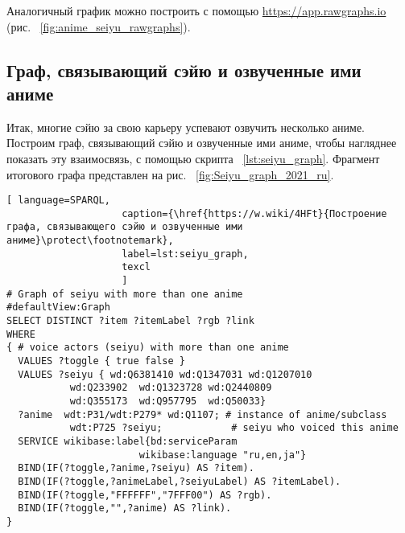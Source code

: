 \newpage

Аналогичный график можно построить с помощью \href{https://app.rawgraphs.io}{https://app.rawgraphs.io} (рис. ~\ref{fig:anime_seiyu_rawgraphs}).

\begin{figure*}[h]

    \setlength{\fboxsep}{0pt}%
    \setlength{\fboxrule}{1pt}%
	\caption[График числа ролей, озвученных различными сэйю, построенный с помощью сервиса Rawgraphs, 2021.]{График числа ролей, озвученных различными сэйю, построенный с помощью сервиса Rawgraphs, 2021. График построена на основе данных, полученных с помощью запроса~\protect\ref{lst:seiyu_titles_graph}.}%
    \label{fig:anime_seiyu_rawgraphs}%
\end{figure*} 

\subsection{Граф, связывающий сэйю и озвученные ими аниме}

Итак, многие сэйю за свою карьеру успевают озвучить несколько аниме. Построим граф, связывающий сэйю и озвученные ими аниме, чтобы нагляднее показать эту взаимосвязь, с помощью скрипта ~\protect\ref{lst:seiyu_graph}. Фрагмент итогового графа представлен на рис. ~\ref{fig:Seiyu_graph_2021_ru}. 

\lstset{numbers=left, firstnumber=1, frame=single}
\begin{lstlisting}[ language=SPARQL, 
                    caption={\href{https://w.wiki/4HFt}{Построение графа, связывающего сэйю и озвученные ими аниме}\protect\footnotemark},
                    label=lst:seiyu_graph,
                    texcl 
                    ]
# Graph of seiyu with more than one anime
#defaultView:Graph
SELECT DISTINCT ?item ?itemLabel ?rgb ?link
WHERE
{ # voice actors (seiyu) with more than one anime
  VALUES ?toggle { true false }
  VALUES ?seiyu { wd:Q6381410 wd:Q1347031 wd:Q1207010 
           wd:Q233902  wd:Q1323728 wd:Q2440809 
           wd:Q355173  wd:Q957795  wd:Q50033}
  ?anime  wdt:P31/wdt:P279* wd:Q1107; # instance of anime/subclass
           wdt:P725 ?seiyu;            # seiyu who voiced this anime 
  SERVICE wikibase:label{bd:serviceParam
					   wikibase:language "ru,en,ja"}
  BIND(IF(?toggle,?anime,?seiyu) AS ?item).
  BIND(IF(?toggle,?animeLabel,?seiyuLabel) AS ?itemLabel).
  BIND(IF(?toggle,"FFFFFF","7FFF00") AS ?rgb).
  BIND(IF(?toggle,"",?anime) AS ?link).
}
\end{lstlisting}%
\lstset{numbers=none}

